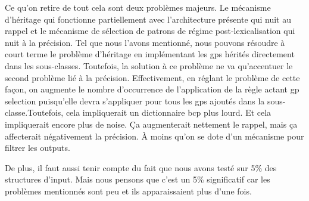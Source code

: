 Ce qu'on retire de tout cela sont deux problèmes majeurs. Le mécanisme d'héritage qui fonctionne partiellement avec l'architecture présente qui nuit au rappel et le mécanisme de sélection de patrons de régime post-lexicalisation qui nuit à la précision. Tel que nous l'avons mentionné, nous pouvons résoudre à court terme le problème d'héritage en implémentant les gps hérités directement dans les sous-classes. Toutefois, la solution à ce problème ne va qu'accentuer le second problème lié à la précision. Effectivement, en réglant le problème de cette façon, on augmente le nombre d'occurrence de l'application de la règle actant gp selection puisqu'elle devra s'appliquer pour tous les gps ajoutés dans la sous-classe.Toutefois, cela impliquerait un dictionnaire bcp plus lourd. Et cela impliquerait encore plus de noise. Ça augmenterait nettement le rappel, mais ça affecterait négativement la précision. À moins qu'on se dote d'un mécanisme pour filtrer les outputs.

De plus, il faut aussi tenir compte du fait que nous avons testé sur 5\% des structures d'input. Mais nous pensons que c'est un 5\% significatif car les problèmes mentionnés sont peu et ils apparaissaient plus d'une fois.

